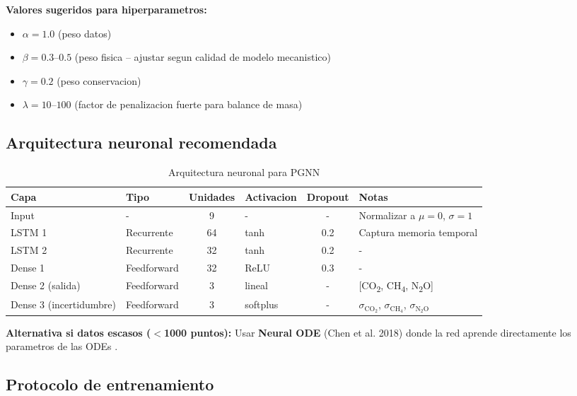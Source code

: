 \documentclass[12pt]{article}
\begin{document}
\textbf{Valores sugeridos para hiperparametros:}
\begin{itemize}
\item $\alpha = 1.0$ (peso datos)
\item $\beta = 0.3$--$0.5$ (peso fisica -- ajustar segun calidad de modelo mecanistico)
\item $\gamma = 0.2$ (peso conservacion)
\item $\lambda = 10$--$100$ (factor de penalizacion fuerte para balance de masa)
\end{itemize}

\subsection{Arquitectura neuronal recomendada}

\begin{table}[H]
\centering
\caption{Arquitectura neuronal para PGNN}
\label{tab:nn_architecture}
\begin{tabular}{|l|l|c|l|c|l|}
\hline
\textbf{Capa} & \textbf{Tipo} & \textbf{Unidades} & \textbf{Activacion} & \textbf{Dropout} & \textbf{Notas} \\ \hline
Input & - & 9 & - & - & Normalizar a $\mu=0$, $\sigma=1$ \\ \hline
LSTM 1 & Recurrente & 64 & tanh & 0.2 & Captura memoria temporal \\ \hline
LSTM 2 & Recurrente & 32 & tanh & 0.2 & - \\ \hline
Dense 1 & Feedforward & 32 & ReLU & 0.3 & - \\ \hline
Dense 2 (salida) & Feedforward & 3 & lineal & - & [CO\textsubscript{2}, CH\textsubscript{4}, N\textsubscript{2}O] \\ \hline
Dense 3 (incertidumbre) & Feedforward & 3 & softplus & - & $\sigma_{\text{CO}_2}$, $\sigma_{\text{CH}_4}$, $\sigma_{\text{N}_2\text{O}}$ \\ \hline
\end{tabular}
\end{table}

\noindent\textbf{Alternativa si datos escasos ($<$1000 puntos):} Usar \textbf{Neural ODE} (Chen et al. 2018) donde la red aprende directamente los parametros de las ODEs \cite{ref4}.

\subsection{Protocolo de entrenamiento}
\end{document}
